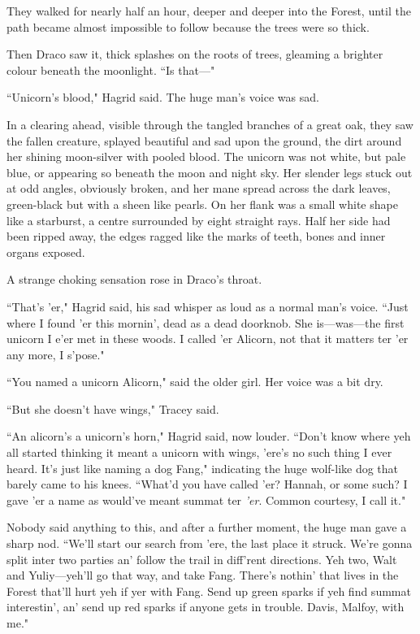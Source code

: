 They walked for nearly half an hour, deeper and deeper into the Forest, until the path became almost impossible to follow because the trees were so thick.

Then Draco saw it, thick splashes on the roots of trees, gleaming a brighter colour beneath the moonlight. ``Is that—"

``Unicorn's blood," Hagrid said. The huge man's voice was sad.

In a clearing ahead, visible through the tangled branches of a great oak, they saw the fallen creature, splayed beautiful and sad upon the ground, the dirt around her shining moon-silver with pooled blood. The unicorn was not white, but pale blue, or appearing so beneath the moon and night sky. Her slender legs stuck out at odd angles, obviously broken, and her mane spread across the dark leaves, green-black but with a sheen like pearls. On her flank was a small white shape like a starburst, a centre surrounded by eight straight rays. Half her side had been ripped away, the edges ragged like the marks of teeth, bones and inner organs exposed.

A strange choking sensation rose in Draco's throat.

``That's 'er," Hagrid said, his sad whisper as loud as a normal man's voice. ``Just where I found 'er this mornin', dead as a dead doorknob. She is—was—the first unicorn I e'er met in these woods. I called 'er Alicorn, not that it matters ter 'er any more, I s'pose."

``You named a unicorn Alicorn," said the older girl. Her voice was a bit dry.

``But she doesn't have wings," Tracey said.

``An alicorn's a unicorn's horn," Hagrid said, now louder. ``Don't know where yeh all started thinking it meant a unicorn with wings, 'ere's no such thing I ever heard. It's just like naming a dog Fang," indicating the huge wolf-like dog that barely came to his knees. ``What'd you have called 'er? Hannah, or some such? I gave 'er a name as would've meant summat ter \emph{'er}. Common courtesy, I call it."

Nobody said anything to this, and after a further moment, the huge man gave a sharp nod. ``We'll start our search from 'ere, the last place it struck. We're gonna split inter two parties an' follow the trail in diff'rent directions. Yeh two, Walt and Yuliy—yeh'll go that way, and take Fang. There's nothin' that lives in the Forest that'll hurt yeh if yer with Fang. Send up green sparks if yeh find summat interestin', an' send up red sparks if anyone gets in trouble. Davis, Malfoy, with me."

